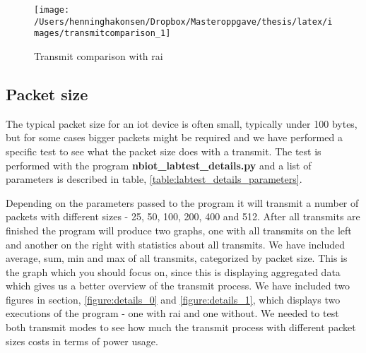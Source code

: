 \documentclass[USenglish]{ifimaster}  %
\begin{document}
\begin{figure}[H]
  \centering\texttt{[image: /Users/henninghakonsen/Dropbox/Masteroppgave/thesis/latex/images/transmitcomparison\_1]}
  \caption{Transmit comparison with \acrshort{rai}}
  \label{figure:transmit_comparison_1}
\end{figure}

\subsection{Packet size} \label{ssection:packetsize}
The typical packet size for an \acrshort{iot} device is often small, typically under 100 bytes, but for some cases bigger packets might be required and we have performed a specific test to see what the packet size does with a transmit. The test is performed with the program \textbf{nbiot\_labtest\_details.py} and a list of parameters is described in table, \vref{table:labtest_details_parameters}.

\begin{table}[H]
\centering
{}
\caption{\textbf{nbiot\_labtest\_details.py} parameters}
\label{table:labtest_details_parameters}
\end{table}

Depending on the parameters passed to the program it will transmit a number of packets with different sizes - 25, 50, 100, 200, 400 and 512. After all transmits are finished the program will produce two graphs, one with all transmits on the left and another on the right with statistics about all transmits. We have included average, sum, min and max of all transmits, categorized by packet size. This is the graph which you should focus on, since this is displaying aggregated data which gives us a better overview of the transmit process. We have included two figures in section, \vref{figure:details_0} and \vref{figure:details_1}, which displays two executions of the program - one with \acrshort{rai} and one without. We needed to test both transmit modes to see how much the transmit process with different packet sizes costs in terms of power usage.
\end{document}
